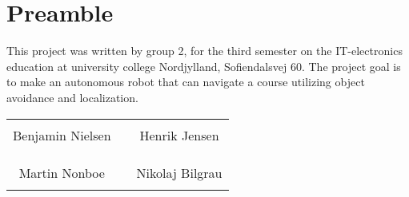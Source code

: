 \chapter*{Preamble}


This project was written by group 2, for the third semester on the IT-electronics education at university college Nordjylland, Sofiendalsvej 60. The project goal is to make an autonomous robot that can navigate a course utilizing object avoidance and localization.
%
\phantom{Luft}\vspace{3cm}
\begin{table}[H]
	\centering
		\begin{tabular}{c c c}
			\underline{\phantom{JAERJAERJAERJAERGO}} & \phantom{cookies} & \underline{\phantom{JAERJAERJAERJAERGO}} \\
			Benjamin Nielsen			& \phantom{cookies} & Henrik Jensen		\\
			&&\\
			&&\\
			\underline{\phantom{JAERJAERJAERJAERGO}} & \phantom{cookies} & \underline{\phantom{JAERJAERJAERJAERGO}} \\
			Martin Nonboe			& \phantom{cookies} & Nikolaj Bilgrau		\\
			&&\\
						
		\end{tabular}
\end{table}
